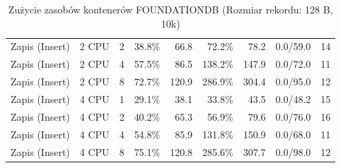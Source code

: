 \begin{table}[ht]
{\begin{tabular}{llcrrrrcc}
Zapis (Insert) & 2 CPU & 2 & 38.8\% & 66.8 & 72.2\% & 78.2 & 0.0/59.0 & 14 \\
Zapis (Insert) & 2 CPU & 4 & 57.5\% & 86.5 & 138.2\% & 147.9 & 0.0/72.0 & 11 \\
Zapis (Insert) & 2 CPU & 8 & 72.7\% & 120.9 & 286.9\% & 304.4 & 0.0/95.0 & 12 \\
Zapis (Insert) & 4 CPU & 1 & 29.1\% & 38.1 & 33.8\% & 43.5 & 0.0/48.2 & 15 \\
Zapis (Insert) & 4 CPU & 2 & 40.2\% & 65.3 & 56.9\% & 79.6 & 0.0/76.0 & 16 \\
Zapis (Insert) & 4 CPU & 4 & 54.8\% & 85.9 & 131.8\% & 150.9 & 0.0/68.0 & 11 \\
Zapis (Insert) & 4 CPU & 8 & 75.1\% & 120.8 & 285.6\% & 307.7 & 0.0/98.0 & 12 \\
\bottomrule
\end{tabular}%
}
\caption{Zużycie zasobów kontenerów FOUNDATIONDB (Rozmiar rekordu: 128 B, 10k)}
\label{tab:resources_foundationdb_small_10000}
\end{table}
